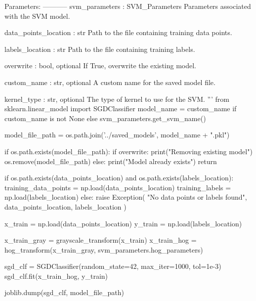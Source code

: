 \begin{pythoncode}
    Parameters:
    -----------
    svm_parameters : SVM_Parameters
        Parameters associated with the SVM model.
    
    data_points_location : str
        Path to the file containing training data points.
    
    labels_location : str
        Path to the file containing training labels.
    
    overwrite : bool, optional
        If True, overwrite the existing model.
    
    custom_name : str, optional
        A custom name for the saved model file.
    
    kernel_type : str, optional
        The type of kernel to use for the SVM.
    '''
    from sklearn.linear_model import SGDClassifier
    model_name = custom_name if custom_name is not None else svm_parameters.get_svm_name()

    model_file_path = os.path.join('../saved_models', model_name + ".pkl")

    if os.path.exists(model_file_path):
      if overwrite:
        print("Removing existing model")
        os.remove(model_file_path)
      else:
        print("Model already exists")
        return

    if os.path.exists(data_points_location) and os.path.exists(labels_location):
        training_data_points = np.load(data_points_location)
        training_labels = np.load(labels_location)
    else:
        raise Exception(
            "No data points or labels found",
            data_points_location,
            labels_location
        )

    x_train = np.load(data_points_location)
    y_train = np.load(labels_location)

    x_train_gray = grayscale_transform(x_train)
    x_train_hog = hog_transform(x_train_gray, svm_parameters.hog_parameters)

    sgd_clf = SGDClassifier(random_state=42, max_iter=1000, tol=1e-3)
    sgd_clf.fit(x_train_hog, y_train)

    joblib.dump(sgd_clf, model_file_path)


\end{pythoncode}


